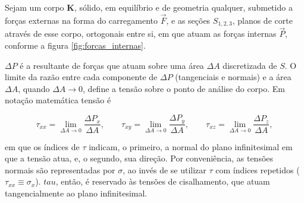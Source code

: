 

Sejam um corpo $\bm{K}$, sólido, em equilíbrio e de geometria qualquer, submetido a forças externas na forma do carregamento $\vec{F}$, e as seções $S_{1,2,3}$, planos de corte através de esse corpo, ortogonais entre si, em que atuam as forças internas $\vec{P}$, conforme a figura \ref{fig:forcas_internas}. 

$\Delta P$ é a resultante de forças que atuam sobre uma área $\Delta A$ discretizada de $S$. O limite da razão entre cada componente de $\Delta P$ (tangenciais e normais) e a área $\Delta A$, quando $\Delta A \to 0$, define a tensão sobre o ponto de análise do corpo. Em notação matemática tensão é

\begin{equation}
    \tau_{xx} = \lim_{\Delta A \to 0} \frac{\Delta P_x}{\Delta A}, \qquad
    \tau_{xy} = \lim_{\Delta A \to 0} \frac{\Delta P_y}{\Delta A}, \qquad
    \tau_{xz} = \lim_{\Delta A \to 0} \frac{\Delta P_z}{\Delta A},
\end{equation}

em que os índices de $\tau$ indicam, o primeiro, a normal do plano infinitesimal em que a tensão atua, e, o segundo, sua direção. Por conveniência, as tensões normais são representadas por $\sigma$, ao invés de se utilizar $\tau$ com índices repetidos ($\tau_{xx} \equiv \sigma_x$). $tau$, então, é reservado às tensões de cisalhamento, que atuam tangencialmente ao plano infinitesimal. 
